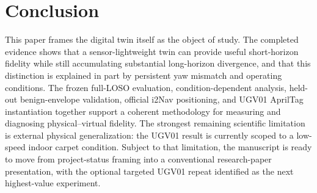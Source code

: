 \documentclass[conference]{IEEEtran}
\begin{document}
\section{Conclusion}
This paper frames the digital twin itself as the object of study. The completed evidence shows that a sensor-lightweight twin can provide useful short-horizon fidelity while still accumulating substantial long-horizon divergence, and that this distinction is explained in part by persistent yaw mismatch and operating conditions. The frozen full-LOSO evaluation, condition-dependent analysis, held-out benign-envelope validation, official i2Nav positioning, and UGV01 AprilTag instantiation together support a coherent methodology for measuring and diagnosing physical--virtual fidelity. The strongest remaining scientific limitation is external physical generalization: the UGV01 result is currently scoped to a low-speed indoor carpet condition. Subject to that limitation, the manuscript is ready to move from project-status framing into a conventional research-paper presentation, with the optional targeted UGV01 repeat identified as the next highest-value experiment.
\end{document}
